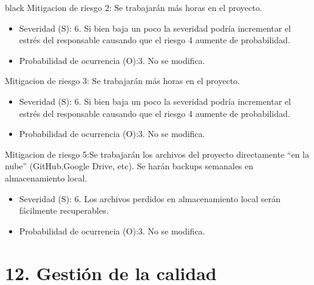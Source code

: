 \documentclass[
11pt, %
codirector, %
]{charter}
\begin{document}
\begin{consigna}{black}
Mitigacion de riesgo 2: Se trabajarán más horas en el proyecto.
\begin{itemize}
	\item Severidad (S):  6.  Si bien baja un poco la severidad podría incrementar el estrés del responsable causando que el riesgo 4 aumente de probabilidad.
	\item Probabilidad de ocurrencia (O):3. No se modifica.
\end{itemize}
Mitigacion de riesgo 3: Se trabajarán más horas en el proyecto.
\begin{itemize}
	\item Severidad (S):  6.  Si bien baja un poco la severidad podría incrementar el estrés del responsable causando que el riesgo 4 aumente de probabilidad.
	\item Probabilidad de ocurrencia (O):3. No se modifica.
\end{itemize}
Mitigacion de riesgo 5:Se trabajarán los archivos del proyecto directamente “en la nube” (GitHub,Google Drive, etc). Se harán backups semanales en almacenamiento local.

\begin{itemize}
	\item Severidad (S):  6. Los archivos perdidos en almacenamiento local serán fácilmente recuperables.
	\item Probabilidad de ocurrencia (O):3. No se modifica.
\end{itemize}
\end{consigna}
\section{12. Gestión de la calidad}
\label{sec:calidad}
\end{document}
